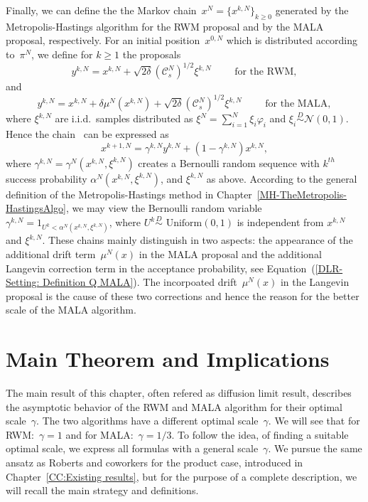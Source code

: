 Finally, we can define the the Markov chain~$x^N = \{ x^{k,N} \}_{k \geq 0}$  generated by the Metropolis-Hastings algorithm for the RWM proposal and by the MALA proposal, respectively. For an initial position~$x^{0,N}$ which is distributed according to~$\pi^N$, we define for $k \geq 1$ the proposals
\begin{equation}
 y^{k,N} = x^{k,N} + \sqrt{2 \delta} (\mathcal{C}_s^{N})^{1/2} \xi^{k,N} \qquad \text{ for the RWM},
\end{equation}
and
\begin{equation}
 y^{k,N} = x^{k,N} + \delta \mu^{N}(x^{k,N}) + \sqrt{2 \delta} (\mathcal{C}_s^{N})^{1/2} \xi^{k,N} \qquad \text{ for the MALA},
\end{equation}
where $\xi^{k,N}$ are i.i.d.\, samples distributed as $\xi^{N} = \sum_{i=1}^{N} \xi_i \varphi_i$ and $\xi_i \stackrel{D}{\sim} \mathcal{N}(0,1)$. Hence the chain~\autocite[Equation~(2.12) and~(2.20), respectively]{Mattingly2010, Pillai2012} can be expressed as
\begin{equation}
\label{DLR-MH chain from algorithm - general form}
 x^{k+1,N} = \gamma^{k,N} y^{k,N} + (1 - \gamma^{k,N}) x^{k,N},
\end{equation}
where  $\gamma^{k,N}= \gamma^{N}(x^{k,N}, \xi^{k,N})$ creates a Bernoulli random sequence with $k^{th}$ success probability $\alpha^{N}(x^{k,N}, \xi^{k,N})$, and $\xi^{k,N}$ as above. According to the general definition of the Metropolis-Hastings method in Chapter~\ref{MH-TheMetropolis-HastingsAlgo}, we may view the Bernoulli random variable~$\gamma^{k,N} = 1_{U^k < \alpha^N(x^{k,N}, \xi^{k,N})}$, where $U^k\stackrel{D}{\sim} \text{ Uniform}(0,1)$ is independent from $x^{k,N}$ and $\xi^{k,N}$. These chains mainly distinguish in two aspects: the appearance of the additional drift term~$\mu^{N}(x)$ in the MALA proposal and the additional Langevin correction term in the acceptance probability, see Equation~(\ref{DLR-Setting: Definition Q MALA}). The incorpoated drift~$\mu^N(x)$ in the Langevin proposal is the cause of these two corrections and hence the reason for the better scale of the MALA algorithm. 


\section{Main Theorem and Implications}
\label{sec:DLR-Main theorem}

The main result of this chapter, often refered as diffusion limit result, describes the asymptotic behavior of the RWM and MALA algorithm for their optimal scale~$\gamma$. The two algorithms have a different optimal scale~$\gamma$. We will see that for RWM:~$\gamma = 1$ and for MALA:~$\gamma = 1/3$. To follow the idea, of finding a suitable optimal scale, we express all formulas with a general scale~$\gamma$. We pursue the same ansatz as Roberts and coworkers for the product case, introduced in Chapter~\ref{CC:Existing results}, but for the purpose of a complete description, we will recall the main strategy and definitions.

